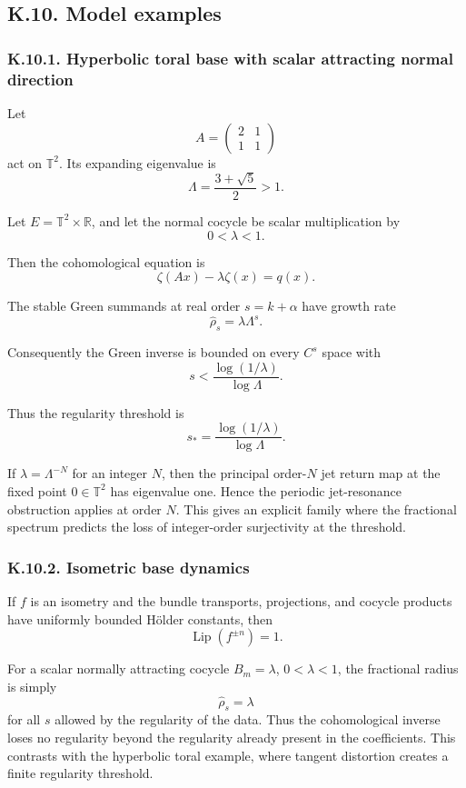 \documentclass[12pt,a4paper]{article}
\theoremstyle{plain}
\numberwithin{equation}{section}
\numberwithin{theorem}{section}
\begin{document}
\subsection{K.10. Model examples}

\subsubsection{K.10.1. Hyperbolic toral base with scalar attracting normal direction}

Let
\[
A=
\begin{pmatrix}
2&1\\
1&1
\end{pmatrix}
\]
act on $\mathbb T^2$. Its expanding eigenvalue is
\[
\Lambda=\frac{3+\sqrt5}{2}>1.
\]

Let $E=\mathbb T^2\times\mathbb R$, and let the normal cocycle be scalar multiplication by
\[
0<\lambda<1.
\]

Then the cohomological equation is
\[
\zeta(Ax)-\lambda\zeta(x)=q(x).
\]

The stable Green summands at real order $s=k+\alpha$ have growth rate
\[
\widehat\rho_s=
\lambda\Lambda^s.
\]

Consequently the Green inverse is bounded on every $C^s$ space with
\[
s<\frac{\log(1/\lambda)}{
\log\Lambda}.
\]

Thus the regularity threshold is
\[
s_*=
\frac{\log(1/\lambda)}{
\log\Lambda}.
\]

If $\lambda=\Lambda^{-N}$ for an integer $N$, then the principal order-$N$ jet return map at the fixed point $0\in\mathbb T^2$ has eigenvalue one. Hence the periodic jet-resonance obstruction applies at order $N$. This gives an explicit family where the fractional spectrum predicts the loss of integer-order surjectivity at the threshold.

\subsubsection{K.10.2. Isometric base dynamics}

If $f$ is an isometry and the bundle transports, projections, and cocycle products have uniformly bounded H\"older constants, then
\[
\operatorname{Lip}(f^{\pm n})=1.
\]

For a scalar normally attracting cocycle $B_m=\lambda$, $0<\lambda<1$, the fractional radius is simply
\[
\widehat\rho_s=\lambda
\]
for all $s$ allowed by the regularity of the data. Thus the cohomological inverse loses no regularity beyond the regularity already present in the coefficients. This contrasts with the hyperbolic toral example, where tangent distortion creates a finite regularity threshold.
\end{document}
